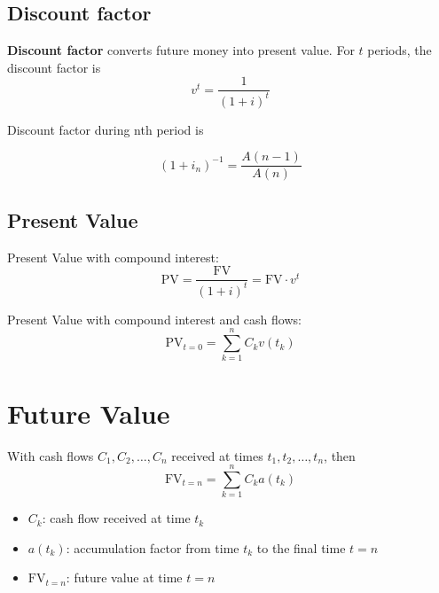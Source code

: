 \subsection{Discount factor}

\begin{definition}
    \textbf{Discount factor} converts future money into present value. For $t$ periods, 
    the discount factor is 
    \[
        v^t = \frac{1}{(1+i)^t}
    \]  

    Discount factor during nth period is

    \[
    (1+i_n)^{-1} = \frac{A(n-1)}{A(n)}
    \]
\end{definition}


\subsection{Present Value}

\begin{definition}
    Present Value with compound interest: 
    \[
        \text{PV} = \frac{\text{FV}}{(1+i)^{t}} = \text{FV} \cdot v^t
    \]  
\end{definition}
   

\begin{definition}
    Present Value with compound interest and cash flows: 
    \[
        \text{PV}_{t=0} = \sum_{k=1}^{n} C_k v(t_k)
    \]
\end{definition}

\section{Future Value}
\begin{definition}
    With cash flows $C_1, C_2, \dots, C_n$ received at times $t_1, t_2, \dots, t_n$, then
    \[
        \text{FV}_{t=n} = \sum_{k=1}^{n} C_k a(t_k)
    \]
    \begin{itemize}
        \item $C_k$: cash flow received at time $t_k$
        \item $a(t_k)$: accumulation factor from time $t_k$ to the final time $t=n$
        \item $\text{FV}_{t=n}$: future value at time $t=n$
    \end{itemize}
\end{definition}